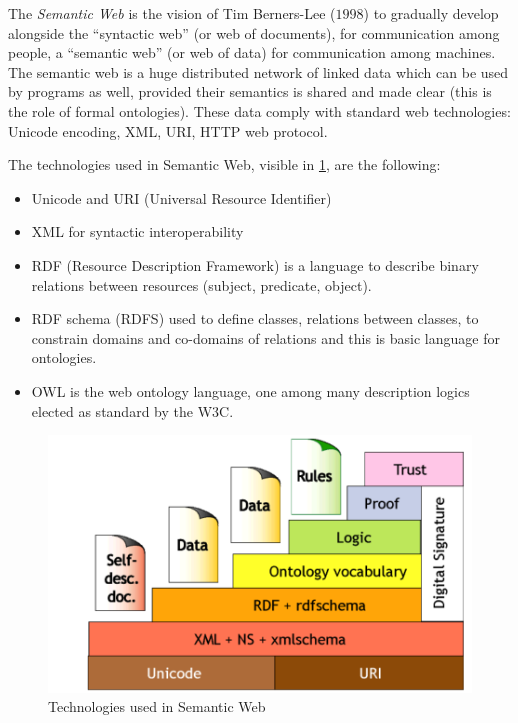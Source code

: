 The \emph{Semantic Web} is the vision of Tim Berners-Lee ($1998$) to gradually
develop alongside the “syntactic web” (or web of documents), for communication among people,
a “semantic web” (or web of data) for communication among machines.\newline
The semantic web is a huge distributed network of linked data which can be used by programs
as well, provided their semantics is shared and made clear 
(this is the role of formal ontologies).\newline
These data comply with standard web technologies: Unicode encoding, XML, URI,
HTTP web protocol.

The technologies used in Semantic Web, visible in \ref{img:semantic}, are the following:
\begin{itemize}
   \item Unicode and URI (Universal Resource Identifier)
   \item XML for syntactic interoperability
   \item RDF (Resource Description Framework) is a language to describe binary
         relations between resources (subject, predicate, object).
   \item RDF schema (RDFS) used to define classes, relations between classes,
	 to constrain domains and co-domains of relations and this is basic language
	 for ontologies.
   \item OWL is the web ontology language, one among many description logics
         elected as standard by the W3C.
\end{itemize}
\begin{figure}
	\includegraphics[width=\textwidth]{Images/semanticTechnologies}
	\caption{Technologies used in Semantic Web}
	\label{img:semantic}
\end{figure}
